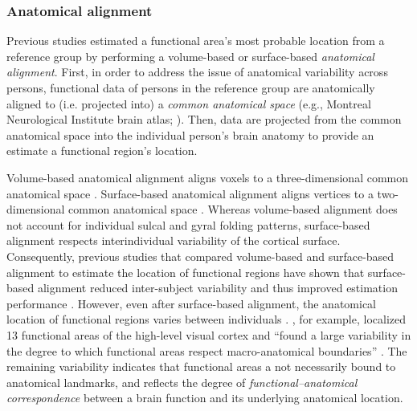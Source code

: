 \subsubsection{Anatomical alignment}

Previous studies estimated a functional area's most probable location from a
reference group by performing a volume-based
\citep[e.g.,][]{zhen2017quantifying, zhen2015quantifying} or surface-based
\citep[e.g.,][]{frost2012measuring, weiner2018defining,
rosenke2021probabilistic, wang2015probabilistic} \textit{anatomical alignment}.
%
First, in order to address the issue of anatomical variability across persons,
functional data of persons in the reference group are anatomically aligned to
(i.e.  projected into) a \textit{common anatomical space} (e.g., Montreal
Neurological Institute brain atlas; \citep[MNI152,][]{fonov2011unbiased}).
Then, data are projected from the common anatomical space into the individual
person's brain anatomy to provide an estimate a functional region's location.

Volume-based anatomical alignment \citep[s.][for a review]{klein2009evaluation}
aligns voxels to a three-dimensional common anatomical space \citep[e.g., MNI152
atlas;][]{fonov2011unbiased}.
Surface-based anatomical alignment \citep{fischl1999cortical, yeo2009spherical}
aligns vertices to a two-dimensional common anatomical space \citep[e.g.,
FreeSurfer's fsaverage template;][]{fischl1999high}.
Whereas volume-based alignment does not account for individual sulcal and gyral
folding patterns, surface-based alignment respects interindividual variability
of the cortical surface.
Consequently, previous studies that compared  volume-based and surface-based
alignment to estimate the location of functional regions have shown that
surface-based alignment reduced inter-subject variability and thus improved
estimation performance \citep{rosenke2021probabilistic, frost2012measuring,
wang2015probabilistic, weiner2018defining}.
However, even after surface-based alignment, the anatomical location of
functional regions varies between individuals \citep[e.g.,][]{coalson2018impact,
benson2014correction, natu2021sulcal, wang2015probabilistic, frost2012measuring,
langers2014assessment, weiner2014mid, rosenke2021probabilistic}.
\citet{frost2012measuring}, for example, localized 13 functional areas of the
high-level visual cortex and ``found a large variability in the degree to
which functional areas respect macro-anatomical boundaries''
\citep[][p. 1369]{frost2012measuring}.
The remaining variability indicates that functional areas a not necessarily
bound to anatomical landmarks, and reflects the degree of
\textit{functional--anatomical correspondence} between a brain function and its
underlying anatomical location.


